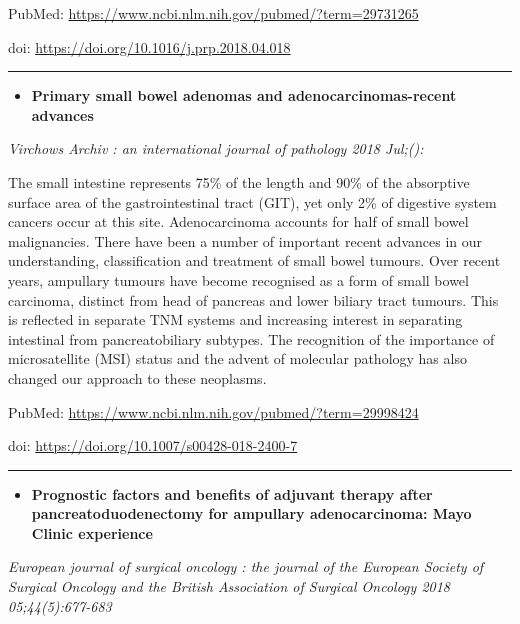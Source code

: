 \documentclass[]{article}
\providecommand{\tightlist}{%
  \setlength{\itemsep}{0pt}\setlength{\parskip}{0pt}}
\begin{document}
PubMed: \url{https://www.ncbi.nlm.nih.gov/pubmed/?term=29731265}

doi: \url{https://doi.org/10.1016/j.prp.2018.04.018}

{}

{}

\begin{center}\rule{0.5\linewidth}{\linethickness}\end{center}

\begin{itemize}
\tightlist
\item
  \textbf{Primary small bowel adenomas and adenocarcinomas-recent
  advances}
\end{itemize}

\emph{Virchows Archiv : an international journal of pathology 2018
Jul;():}

The small intestine represents 75\% of the length and 90\% of the
absorptive surface area of the gastrointestinal tract (GIT), yet only
2\% of digestive system cancers occur at this site. Adenocarcinoma
accounts for half of small bowel malignancies. There have been a number
of important recent advances in our understanding, classification and
treatment of small bowel tumours. Over recent years, ampullary tumours
have become recognised as a form of small bowel carcinoma, distinct from
head of pancreas and lower biliary tract tumours. This is reflected in
separate TNM systems and increasing interest in separating intestinal
from pancreatobiliary subtypes. The recognition of the importance of
microsatellite (MSI) status and the advent of molecular pathology has
also changed our approach to these neoplasms.

PubMed: \url{https://www.ncbi.nlm.nih.gov/pubmed/?term=29998424}

doi: \url{https://doi.org/10.1007/s00428-018-2400-7}

{}

{}

\begin{center}\rule{0.5\linewidth}{\linethickness}\end{center}

\begin{itemize}
\tightlist
\item
  \textbf{Prognostic factors and benefits of adjuvant therapy after
  pancreatoduodenectomy for ampullary adenocarcinoma: Mayo Clinic
  experience}
\end{itemize}

\emph{European journal of surgical oncology : the journal of the
European Society of Surgical Oncology and the British Association of
Surgical Oncology 2018 05;44(5):677-683}
\end{document}
